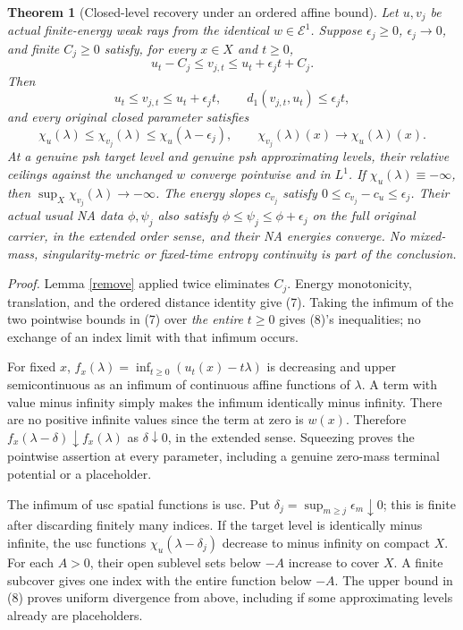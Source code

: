 \documentclass[
  11pt,
]{article}
\newtheorem{theorem}{Theorem}
\begin{document}
\begin{theorem}[Closed-level recovery under an ordered affine bound]
\label{levels}
Let $u,v_j$ be actual finite-energy weak rays from the identical
$w\in\mathcal E^1$. Suppose $\epsilon_j\ge0$,
$\epsilon_j\to0$, and finite $C_j\ge0$ satisfy, for every
$x\in X$ and $t\ge0$,
\[
u_t-C_j\le v_{j,t}\le u_t+\epsilon_jt+C_j.                \tag{6}
\]
Then
\[
u_t\le v_{j,t}\le u_t+\epsilon_jt,
\qquad d_1(v_{j,t},u_t)\le\epsilon_jt,                   \tag{7}
\]
and every original closed parameter satisfies
\[
\chi_u(\lambda)\le\chi_{v_j}(\lambda)
                  \le\chi_u(\lambda-\epsilon_j),
\qquad\chi_{v_j}(\lambda)(x)\to\chi_u(\lambda)(x).       \tag{8}
\]
At a genuine psh target level and genuine psh approximating levels,
their relative ceilings against the unchanged $w$ converge
pointwise and in $L^1$. If $\chi_u(\lambda)\equiv-\infty$,
then $\sup_X\chi_{v_j}(\lambda)\to-\infty$.
The energy slopes $c_{v_j}$ satisfy
$0\le c_{v_j}-c_u\le\epsilon_j$.
Their actual usual NA data $\phi,\psi_j$ also satisfy
$\phi\le\psi_j\le\phi+\epsilon_j$ on the full original carrier, in
the extended order sense, and their NA energies converge.
No mixed-mass, singularity-metric or fixed-time entropy continuity is
part of the conclusion.
\end{theorem}

\emph{Proof.} Lemma \ref{remove} applied twice eliminates \(C_j\).
Energy monotonicity, translation, and the ordered distance identity give
(7). Taking the infimum of the two pointwise bounds in (7) over
\emph{the entire} \(t\ge0\) gives (8)'s inequalities; no exchange of an
index limit with that infimum occurs.

For fixed \(x\), \(f_x(\lambda)=\inf_{t\ge0}
(u_t(x)-t\lambda)\) is decreasing and upper semicontinuous as an infimum
of continuous affine functions of \(\lambda\). A term with value minus
infinity simply makes the infimum identically minus infinity. There are
no positive infinite values since the term at zero is \(w(x)\).
Therefore \(f_x(\lambda-\delta)\downarrow
f_x(\lambda)\) as \(\delta\downarrow0\), in the extended sense.
Squeezing proves the pointwise assertion at every parameter, including a
genuine zero-mass terminal potential or a placeholder.

The infimum of usc spatial functions is usc. Put
\(\delta_j=\sup_{m\ge j}\epsilon_m\downarrow0\); this is finite after
discarding finitely many indices. If the target level is identically
minus infinite, the usc functions \(\chi_u(\lambda-\delta_j)\) decrease
to minus infinity on compact \(X\). For each \(A>0\), their open
sublevel sets below \(-A\) increase to cover \(X\). A finite subcover
gives one index with the entire function below \(-A\). The upper bound
in (8) proves uniform divergence from above, including if some
approximating levels already are placeholders.
\end{document}

